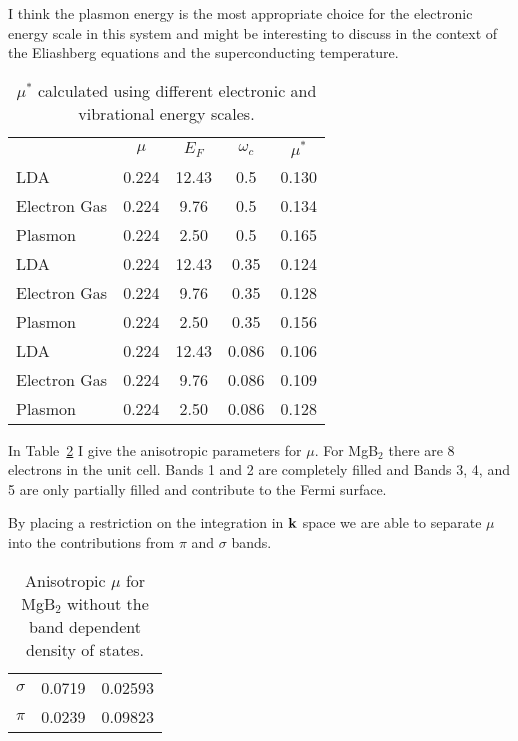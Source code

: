 \documentclass{article}
\def\k{{\bf k}}
\begin{document}
I think the plasmon energy is the most appropriate
choice for the electronic energy scale in this system
and might be interesting to discuss in the context of the 
Eliashberg equations and the superconducting temperature.
%
\begin{table}
\begin{center}
\begin{tabular}{l c c c c}
\hline
\hline
             & $\mu$  & $E_{F}$  & $\omega_{c}$  & $\mu^{*}$ \\
LDA          & 0.224  & 12.43    & 0.5    & 0.130 \\ 
Electron Gas & 0.224  & 9.76     & 0.5    & 0.134 \\
Plasmon      & 0.224  & 2.50     & 0.5    & 0.165 \\
\hline
LDA          & 0.224  & 12.43    & 0.35   & 0.124 \\
Electron Gas & 0.224  & 9.76     & 0.35   & 0.128 \\
Plasmon      & 0.224  & 2.50     & 0.35   & 0.156 \\
\hline
LDA          & 0.224  & 12.43    & 0.086  & 0.106 \\
Electron Gas & 0.224  & 9.76     & 0.086  & 0.109 \\ 
Plasmon      & 0.224  & 2.50     & 0.086  & 0.128 \\
\end{tabular}
\caption{$\mu^{*}$ calculated using different electronic and vibrational
energy scales. \label{tab:mgb2}}
\end{center}
\end{table}

In Table~\ref{tab:mgb2aniso} I give the anisotropic parameters for $\mu$. For
MgB$_{2}$ there are 8 electrons in the unit cell. Bands 1 and 2
are completely filled and Bands 3, 4, and 5 are only partially
filled and contribute to the Fermi surface. 

By placing a restriction on the integration in $\k$ space we are
able to separate $\mu$ into the contributions from $\pi$ and $\sigma$
bands. 

\begin{table}
\begin{center}
\begin{tabular}{l c c}
$\sigma$  & 0.0719  & 0.02593   \\
$\pi$     & 0.0239  & 0.09823   \\
\end{tabular}
\caption{Anisotropic $\mu$ for MgB$_2$ without the band dependent density of states. \label{tab:mgb2aniso}}
\end{center}
\end{table}
\end{document}

